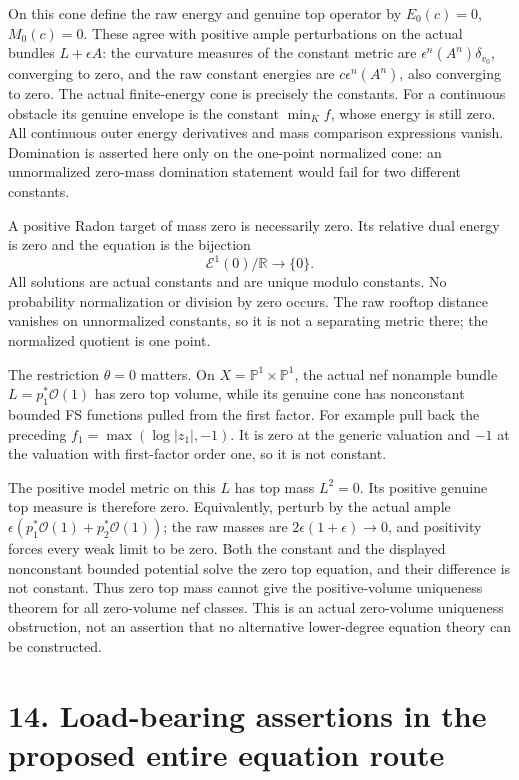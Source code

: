 \documentclass[
  10pt,
]{article}
\begin{document}
On this cone define the raw energy and genuine top operator by
\(E_0(c)=0\), \(M_0(c)=0\). These agree with positive ample
perturbations on the actual bundles \(L+\epsilon A\): the curvature
measures of the constant metric are \(\epsilon^n(A^n)\delta_{v_0}\),
converging to zero, and the raw constant energies are
\(c\epsilon^n(A^n)\), also converging to zero. The actual finite-energy
cone is precisely the constants. For a continuous obstacle its genuine
envelope is the constant \(\min_K f\), whose energy is still zero. All
continuous outer energy derivatives and mass comparison expressions
vanish. Domination is asserted here only on the one-point normalized
cone: an unnormalized zero-mass domination statement would fail for two
different constants.

A positive Radon target of mass zero is necessarily zero. Its relative
dual energy is zero and the equation is the bijection
\[\mathcal E^1(0)/\mathbb R\longrightarrow\{0\}.\] All solutions are
actual constants and are unique modulo constants. No probability
normalization or division by zero occurs. The raw rooftop distance
vanishes on unnormalized constants, so it is not a separating metric
there; the normalized quotient is one point.

The restriction \(\theta=0\) matters. On
\(X=\mathbb P^1\times\mathbb P^1\), the actual nef nonample bundle
\(L=p_1^*\mathcal O(1)\) has zero top volume, while its genuine cone has
nonconstant bounded FS functions pulled from the first factor. For
example pull back the preceding \(f_1=\max(\log|z_1|,-1)\). It is zero
at the generic valuation and \(-1\) at the valuation with first-factor
order one, so it is not constant.

The positive model metric on this \(L\) has top mass \(L^2=0\). Its
positive genuine top measure is therefore zero. Equivalently, perturb by
the actual ample \(\epsilon(p_1^*\mathcal O(1)+p_2^*\mathcal O(1))\);
the raw masses are \(2\epsilon(1+\epsilon)\to0\), and positivity forces
every weak limit to be zero. Both the constant and the displayed
nonconstant bounded potential solve the zero top equation, and their
difference is not constant. Thus zero top mass cannot give the
positive-volume uniqueness theorem for all zero-volume nef classes. This
is an actual zero-volume uniqueness obstruction, not an assertion that
no alternative lower-degree equation theory can be constructed.

\section{14. Load-bearing assertions in the proposed entire equation
route}\label{load-bearing-assertions-in-the-proposed-entire-equation-route}
\end{document}
